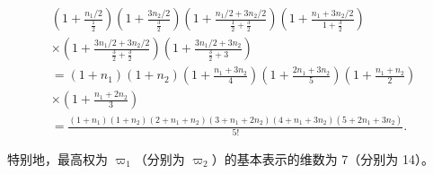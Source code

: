 \[
\begin{array}{c} \left(1 + \frac {n _ {1} / 2}{\frac {1}{2}}\right) \left(1 + \frac {3 n _ {2} / 2}{\frac {3}{2}}\right) \left(1 + \frac {n _ {1} / 2 + 3 n _ {2} / 2}{\frac {1}{2} + \frac {3}{2}}\right) \left(1 + \frac {n _ {1} + 3 n _ {2} / 2}{1 + \frac {3}{2}}\right) \\ \times \left(1 + \frac {3 n _ {1} / 2 + 3 n _ {2} / 2}{\frac {3}{2} + \frac {3}{2}}\right) \left(1 + \frac {3 n _ {1} / 2 + 3 n _ {2}}{\frac {3}{2} + 3}\right) \\ = (1 + n _ {1}) (1 + n _ {2}) \left(1 + \frac {n _ {1} + 3 n _ {2}}{4}\right) \left(1 + \frac {2 n _ {1} + 3 n _ {2}}{5}\right) \left(1 + \frac {n _ {1} + n _ {2}}{2}\right) \\ \times \left(1 + \frac {n _ {1} + 2 n _ {2}}{3}\right) \\ = \frac {(1 + n _ {1}) (1 + n _ {2}) (2 + n _ {1} + n _ {2}) (3 + n _ {1} + 2 n _ {2}) (4 + n _ {1} + 3 n _ {2}) (5 + 2 n _ {1} + 3 n _ {2})}{5 !}. \end{array}
\]

特别地，最高权为 \(\varpi_{1}\)（分别为 \(\varpi_{2}\)）的基本表示的维数为 7（分别为 14）。

